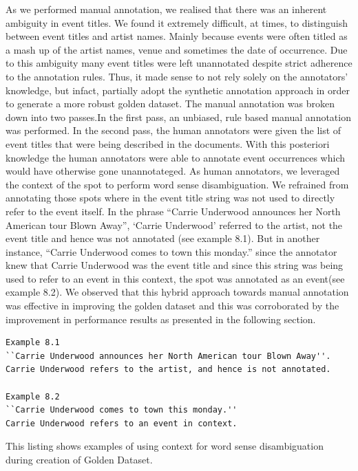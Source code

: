\documentclass[a4paper,11pt]{report}
\begin{document}
As we performed manual annotation, we realised that there was an inherent ambiguity in event titles. We found it extremely difficult, at times, to distinguish between event titles and artist names. Mainly because events were often titled as a mash up of the artist names, venue and sometimes the date of occurrence. Due to this ambiguity many event titles were left unannotated despite strict adherence to the annotation rules. Thus, it made sense to not rely solely on the annotators' knowledge, but infact, partially adopt the synthetic annotation approach in order to generate a more robust golden dataset. The manual annotation was broken down into two passes.In the first pass, an unbiased, rule based manual annotation was performed. In the second pass, the human annotators were given the list of event titles that were being described in the documents. With this posteriori knowledge the human annotators were able to annotate event occurrences which would have otherwise gone unannotateged. As human annotators, we leveraged the context of the spot to perform word sense disambiguation. We refrained from annotating those spots where in the event title string was not used to directly refer to the event itself. In the phrase ``Carrie Underwood announces her North American tour Blown Away'', `Carrie Underwood' referred to the artist, not the event title and hence was not annotated (see example 8.1). But in another instance, ``Carrie Underwood comes to town this monday.'' since the annotator knew that Carrie Underwood was the event title and since this string was being used to refer to an event in this context, the spot was annotated as an event(see example 8.2). We observed that this hybrid approach towards manual annotation was effective in improving the golden dataset and this was corroborated by the improvement in performance results as presented in the following section. \newline

\begin{lstlisting}
Example 8.1
``Carrie Underwood announces her North American tour Blown Away''.
Carrie Underwood refers to the artist, and hence is not annotated.

Example 8.2
``Carrie Underwood comes to town this monday.''
Carrie Underwood refers to an event in context.

\end{lstlisting}
This listing shows examples of using context for word sense disambiguation during creation of Golden Dataset.


\end{document}
